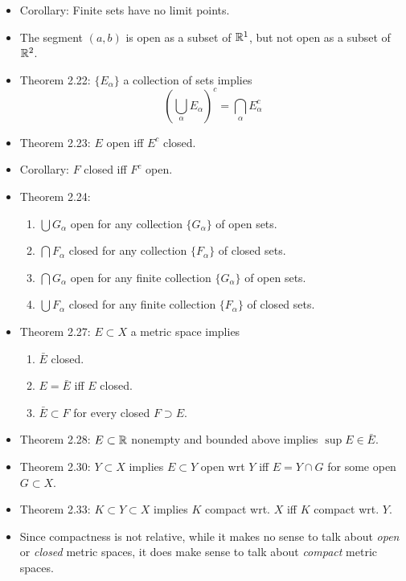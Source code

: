 \documentclass[../../notes.tex]{subfiles}
\begin{document}
\begin{itemize}
    \item Corollary: Finite sets have no limit points.
    \item The segment $(a,b)$ is open as a subset of $\mathbb{R}^1$, but not open as a subset of $\mathbb{R}^2$.
    \item Theorem 2.22: $\{E_\alpha\}$ a collection of sets implies
    \begin{equation*}
        \left( \bigcup_\alpha E_\alpha \right)^c = \bigcap_\alpha E_\alpha^c
    \end{equation*}
    \item Theorem 2.23: $E$ open iff $E^c$ closed.
    \item Corollary: $F$ closed iff $F^c$ open.
    \item Theorem 2.24:
    \begin{enumerate}[label={(\alph*)}]
        \item $\bigcup G_\alpha$ open for any collection $\{G_\alpha\}$ of open sets.
        \item $\bigcap F_\alpha$ closed for any collection $\{F_\alpha\}$ of closed sets.
        \item $\bigcap G_\alpha$ open for any finite collection $\{G_\alpha\}$ of open sets.
        \item $\bigcup F_\alpha$ closed for any finite collection $\{F_\alpha\}$ of closed sets.
    \end{enumerate}
    \item Theorem 2.27: $E\subset X$ a metric space implies
    \begin{enumerate}[label={(\alph*)}]
        \item $\bar{E}$ closed.
        \item $E=\bar{E}$ iff $E$ closed.
        \item $\bar{E}\subset F$ for every closed $F\supset E$.
    \end{enumerate}
    \item Theorem 2.28: $E\subset\mathbb{R}$ nonempty and bounded above implies $\sup E\in\bar{E}$.
    \item Theorem 2.30: $Y\subset X$ implies $E\subset Y$ open wrt $Y$ iff $E=Y\cap G$ for some open $G\subset X$.
    \item Theorem 2.33: $K\subset Y\subset X$ implies $K$ compact wrt. $X$ iff $K$ compact wrt. $Y$.
    \item Since compactness is not relative, while it makes no sense to talk about \emph{open} or \emph{closed} metric spaces, it does make sense to talk about \emph{compact} metric spaces.

\end{itemize}
\end{document}
